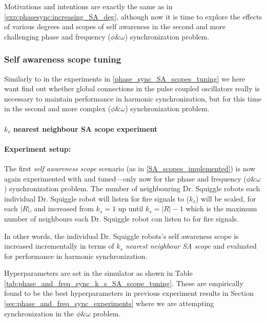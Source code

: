 	Motivations and intentions are exactly the same as in \ref{exp:phasesync:increasing_SA_deg}, although now it is time to explore the effects of various degrees and scopes of self awareness in the second and more challenging phase and frequency ($\phi \& \omega$) synchronization problem.
	
		\subsubsection{Self awareness scope tuning}
		\label{phase_and_freq_sync_SA_scopes_tuning}
		
		Similarly to in the experiments in \ref{phase_sync_SA_scopes_tuning} we here want find out whether global connections in the pulse coupled oscillators really is necessary to maintain performance in harmonic synchronization, but for this time in the second and more complex ($\phi \& \omega$) synchronization problem.
		
			\paragraph{$k_s$ nearest neighbour SA scope experiment\nl}
			
				\paragraph{Experiment setup:\nl}
			
				The first \textit{self awareness scope} scenario (as in \ref{SA_scopes_implemented}) is now again experimented with and tuned—only now for the phase and frequency ($\phi \& \omega$) synchronization problem. The number of neighbouring Dr. Squiggle robots each individual Dr. Squiggle robot will listen for fire signals to ($k_s$) will be scaled, for each $|R|$, and increased from $k_s=1$ up until $k_s=|R|-1$ which is the maximum number of neighbours each Dr. Squiggle robot can listen to for fire signals.
				
				In other words, the individual Dr. Squiggle robots's self awareness scope is increased incrementally in terms of \textit{$k_s$ nearest neighbour SA scope} and evaluated for performance in harmonic synchronization.

				Hyperparameters are set in the simulator as shown in Table \ref{tab:phase_and_freq_sync_k_s_SA_scope_tuning}. These are empirically found to be the best hyperparameters in previous experiment results in Section \ref{sec:phase_and_freq_sync_experiments} where we are attempting synchronization in the $\phi \& \omega$ problem.
				
